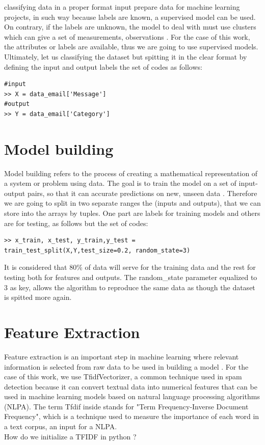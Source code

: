 \documentclass[12pt,a4paper]{article}
\begin{document}
classifying data in a proper format input prepare data for machine learning projects, in such way because labels are known, a supervised model can be used. On contrary, if the labels are unknown, the model to deal with must use clusters which can give a set of measurements, observations \cite{han2022data}.   
For the case of this work, the attributes or labels are available, thus we are going to use supervised models. Ultimately, let us classifying the dataset but spitting it in the clear format by defining the input and output labels the set of codes as follows:
\begin{verbatim} 
#input
>> X = data_email['Message']
#output 
>> Y = data_email['Category']
\end{verbatim}
\section{Model building}
Model building refers to the process of creating a mathematical representation of a system or problem using data. The goal is to train the model on a set of input-output pairs, so that it can accurate predictions on new, unseen data \cite{introducgtionMlAlpay}. Therefore we are going to split in two separate ranges the (inputs and outputs), that we can store into the arrays by tuples. One part are labels for training models and others are for testing, as follows but the set of codes:
\begin{verbatim}
>> x_train, x_test, y_train,y_test =
train_test_split(X,Y,test_size=0.2, random_state=3)
\end{verbatim}
It is considered that 80\% of data will serve for the training data and the rest for testing both for features and outputs. 
The random\_state parameter equalized to 3 as key, allows the algorithm to reproduce the same data as though the dataset is spitted more again.
\section{Feature Extraction }
Feature extraction is an important step in machine learning where relevant information is selected from raw data to be used in building a model \cite{fetAnjali2018}. For the case of this work, we use TfidfVectorizer, a common technique used in spam detection because it can convert textual data into numerical features that can be used in machine learning models based on natural language processing algorithms (NLPA). 
The term Tfdif inside stands for "Term Frequency-Inverse Document Frequency", which is a technique used to measure the importance of each word in a text corpus, an input for a NLPA.\\
How do we initialize a TFIDF in python ? 
\end{document}
